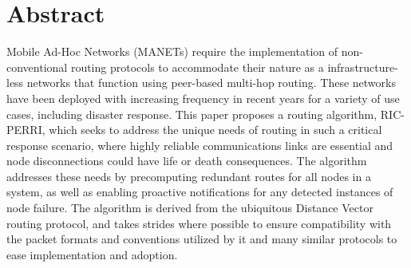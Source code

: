 \section*{Abstract}
Mobile Ad-Hoc Networks (MANETs) require the implementation of non-conventional routing protocols to accommodate their nature as a infrastructure-less networks that function using peer-based multi-hop routing. These networks have been deployed with increasing frequency in recent years for a variety of use cases, including disaster response. This paper proposes a routing algorithm, RIC-PERRI, which seeks to address the unique needs of routing in such a critical response scenario, where highly reliable communications links are essential and node disconnections could have life or death consequences. The algorithm addresses these needs by precomputing redundant routes for all nodes in a system, as well as enabling proactive notifications for any detected instances of node failure. The algorithm is derived from the ubiquitous Distance Vector routing protocol, and takes strides where possible to ensure compatibility with the packet formats and conventions utilized by it and many similar protocols to ease implementation and adoption.